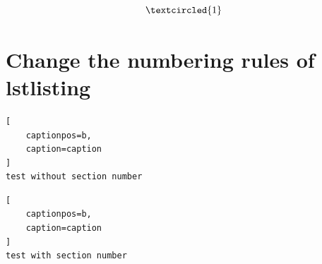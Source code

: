 \documentclass{article}
\begin{document}
\[\textcircled{\scriptsize 1}\]


\section{Change the numbering rules of lstlisting}

\begin{lstlisting}[
	captionpos=b,
	caption=caption
]
test without section number
\end{lstlisting}

\renewcommand{\thelstlisting}{\thesection.\arabic{lstlisting}}

\begin{lstlisting}[
	captionpos=b,
	caption=caption
]
test with section number
\end{lstlisting}
\end{document}
